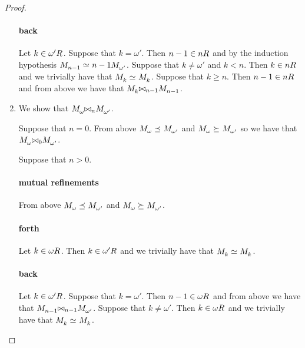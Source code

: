 \begin{proof}
\begin{enumerate}
    \paragraph{back}

    Let $k \in \kSuccessors{}{\omega'}$. 
    Suppose that $k = \omega'$. 
    Then $n - 1 \in \kSuccessors{}{n}$ and by the induction hypothesis $\kPModel{n - 1} \bisimilar{n - 1} \kPModel{\omega'}$.
    Suppose that $k \neq \omega'$ and $k < n$. Then $k \in \kSuccessors{}{n}$ and we trivially have that $\kPModel{k} \bisimilar \kPModel{k}$.
    Suppose that $k \geq n$. Then $n - 1 \in \kSuccessors{}{n}$ and from above we have that $\kPModel{k} \bisimref[n - 1] \kPModel{n - 1}$.
    
    \item We show that $\kPModel{\omega} \bisimref[n] \kPModel{\omega'}$.

    Suppose that $n = 0$. 
    From above $\kPModel{\omega} \refines \kPModel{\omega'}$ and  $\kPModel{\omega} \simulates \kPModel{\omega'}$ so we have that $\kPModel{\omega} \bisimref[0] \kPModel{\omega'}$.

    Suppose that $n > 0$.

    \paragraph{mutual refinements}

    From above $\kPModel{\omega} \refines \kPModel{\omega'}$ and  $\kPModel{\omega} \simulates \kPModel{\omega'}$.

    \paragraph{forth}

    Let $k \in \kSuccessors{}{\omega}$.
    Then $k \in \kSuccessors{}{\omega'}$ and we trivially have that $\kPModel{k} \bisimilar \kPModel{k}$.

    \paragraph{back}

    Let $k \in \kSuccessors{}{\omega'}$.
    Suppose that $k = \omega'$.
    Then $n - 1 \in \kSuccessors{}{\omega}$ and from above we have that $\kPModel{n - 1} \bisimref[n - 1] \kPModel{\omega'}$.
    Suppose that $k \neq \omega'$.
    Then $k \in \kSuccessors{}{\omega}$ and we trivially have that $\kPModel{k} \bisimilar \kPModel{k}$.
\end{enumerate}


\end{proof}
